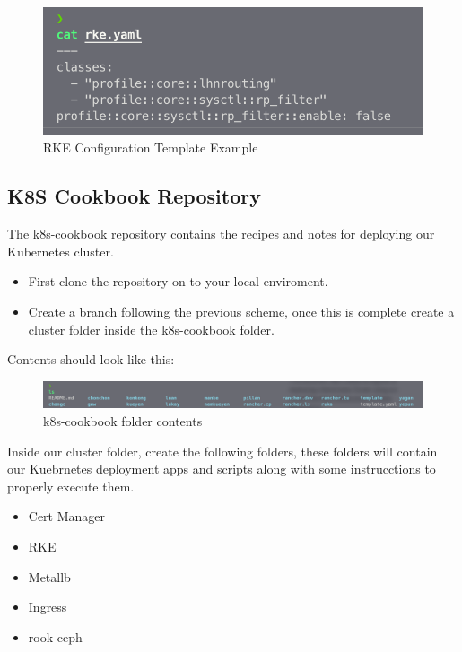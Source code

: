 \begin{figure}
    \includegraphics[width=12cm]{Images/Image9.png}
    \centering
    \caption{RKE Configuration Template Example}
    \end{figure}
    
\vfill\eject

\subsection{K8S Cookbook Repository}

The k8s-cookbook repository contains the recipes and notes for deploying our Kubernetes cluster.

\begin{itemize}
    \item First clone the repository on to your local enviroment. 
    \item Create a branch following the previous scheme, once this is complete create a cluster folder inside the k8s-cookbook folder.
\end{itemize}

Contents should look like this:

\begin{figure}
    \includegraphics[width=12cm]{Images/Image10.png}
    \centering
    \caption{k8s-cookbook folder contents}
    \end{figure}


Inside our cluster folder, create the following folders, these folders will contain our Kuebrnetes deployment apps and scripts along with some instrucctions to properly execute them.

\begin{itemize}
    \item Cert Manager
    \item RKE
    \item Metallb
    \item Ingress
    \item rook-ceph
\end{itemize}

